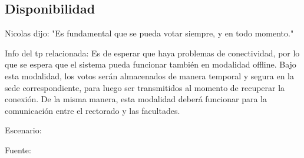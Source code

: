 \subsection{Disponibilidad}
Nicolas dijo:
"Es fundamental que se pueda votar siempre, y en todo momento."


Info del tp relacionada:
Es de esperar que haya problemas de conectividad, por lo que se espera que el sistema
pueda funcionar también en modalidad offline. Bajo esta modalidad, los votos serán
almacenados de manera temporal y segura en la sede correspondiente, para luego ser
transmitidos al momento de recuperar la conexión. De la misma manera, esta modalidad
deberá funcionar para la comunicación entre el rectorado y las facultades.

Escenario:


Fuente: